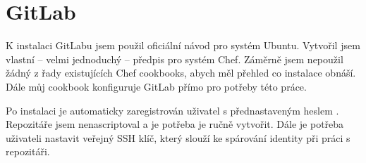 
\section{GitLab}
    K instalaci GitLabu jsem použil oficiální návod pro systém Ubuntu. Vytvořil jsem vlastní -- velmi jednoduchý -- předpis pro systém Chef. Záměrně jsem nepoužil žádný z řady existujících Chef cookbooks, abych měl přehled co instalace obnáší. Dále můj cookbook konfiguruje GitLab přímo pro potřeby této práce.

    Po instalaci je automaticky zaregistrován uživatel  s přednastaveným heslem . Repozitáře jsem nenascriptoval a je potřeba je ručně vytvořit. Dále je potřeba uživateli nastavit veřejný SSH klíč, který slouží ke spárování identity při práci s repozitáři.

